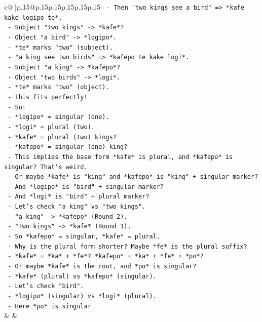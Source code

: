 \documentclass{article}
\begin{document}
{\begin{supertabular}{c@{$\;$}|p{.15\linewidth}@{}p{.15\linewidth}p{.15\linewidth}p{.15\linewidth}p{.15\linewidth}p{.15\linewidth}}
{{{\texttt{          {-} Then "two kings see a bird" => *kafe kake logipo te*.} \\
\texttt{            {-} Subject "two kings" {-}> *kafe*?} \\
\texttt{            {-} Object "a bird" {-}> *logipo*.} \\
\texttt{            {-} *te* marks "two" (subject).} \\
\texttt{          {-} "a king see two birds" => *kafepo te kake logi*.} \\
\texttt{            {-} Subject "a king" {-}> *kafepo*?} \\
\texttt{            {-} Object "two birds" {-}> *logi*.} \\
\texttt{            {-} *te* marks "two" (object).} \\
\texttt{          {-} This fits perfectly!} \\
\texttt{          {-} So:} \\
\texttt{            {-} *logipo* = singular (one).} \\
\texttt{            {-} *logi* = plural (two).} \\
\texttt{            {-} *kafe* = plural (two) kings?} \\
\texttt{            {-} *kafepo* = singular (one) king?} \\
\texttt{          {-} This implies the base form *kafe* is plural, and *kafepo* is singular? That's weird.} \\
\texttt{          {-} Or maybe *kafe* is "king" and *kafepo* is "king" + singular marker?} \\
\texttt{          {-} And *logipo* is "bird" + singular marker?} \\
\texttt{          {-} And *logi* is "bird" + plural marker?} \\
\texttt{          {-} Let's check "a king" vs "two kings".} \\
\texttt{            {-} "a king" {-}> *kafepo* (Round 2).} \\
\texttt{            {-} "two kings" {-}> *kafe* (Round 1).} \\
\texttt{            {-} So *kafepo* = singular, *kafe* = plural.} \\
\texttt{            {-} Why is the plural form shorter? Maybe *fe* is the plural suffix?} \\
\texttt{            {-} *kafe* = *ka* + *fe*? *kafepo* = *ka* + *fe* + *po*?} \\
\texttt{            {-} Or maybe *kafe* is the root, and *po* is singular?} \\
\texttt{            {-} *kafe* (plural) vs *kafepo* (singular).} \\
\texttt{            {-} Let's check "bird".} \\
\texttt{            {-} *logipo* (singular) vs *logi* (plural).} \\
\texttt{            {-} Here *po* is singular} \\
            }
        }
    }
    & & \\ \\


\end{supertabular}}
\end{document}
